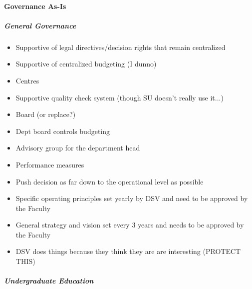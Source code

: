 \paragraph*{Governance As-Is}
\subparagraph*{General Governance}
\begin{itemize}


\item Supportive of legal directives/decision rights that remain centralized

\item Supportive of centralized budgeting (I dunno)

\item Centres

\item Supportive quality check system (though SU doesn't really use it...)

\item Board (or replace?)

\item Dept board controls budgeting

\item Advisory group for the department head

\item Performance measures

\item Push decision as far down to the operational level as possible

\item Specific operating principles set yearly by DSV and need to be approved by the Faculty

\item General strategy and vision set every 3 years and needs to be approved by the Faculty

\item DSV does things because they think they are are interesting (PROTECT THIS)

\end{itemize}
\subparagraph*{Undergraduate Education}
